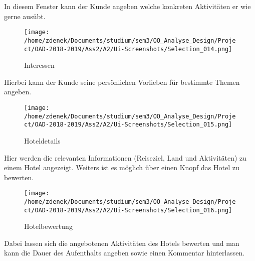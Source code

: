 \documentclass[a4paper]{article}
\begin{document}
In diesem Fenster kann der Kunde angeben welche konkreten Aktivitäten er wie gerne ausübt. 

\begin{figure}[h]
\centering
\caption{Interessen}
\texttt{[image: /home/zdenek/Documents/studium/sem3/OO\_Analyse\_Design/Project/OAD-2018-2019/Ass2/A2/Ui-Screenshots/Selection\_014.png]}
\end{figure}

Hierbei kann der Kunde seine persönlichen Vorlieben für bestimmte Themen angeben.

\begin{figure}[h]
\centering
\caption{Hoteldetails}
\texttt{[image: /home/zdenek/Documents/studium/sem3/OO\_Analyse\_Design/Project/OAD-2018-2019/Ass2/A2/Ui-Screenshots/Selection\_015.png]}
\end{figure}

Hier werden die relevanten Informationen (Reiseziel, Land und Aktivitäten) zu einem Hotel angezeigt. Weiters ist es möglich über einen Knopf das Hotel zu bewerten.

\begin{figure}[h]
\centering
\caption{Hotelbewertung}
\texttt{[image: /home/zdenek/Documents/studium/sem3/OO\_Analyse\_Design/Project/OAD-2018-2019/Ass2/A2/Ui-Screenshots/Selection\_016.png]}
\end{figure}

Dabei lassen sich die angebotenen Aktivitäten des Hotels bewerten und man kann die Dauer des Aufenthalts angeben sowie einen Kommentar hinterlassen.
\end{document}

